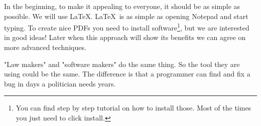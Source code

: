 \documentclass{article}
\begin{document}
In the beginning, to make it appealing to everyone, it should be as simple as possible.
We will use \LaTeX.
\LaTeX~is as simple as opening Notepad and start typing.
To create nice PDFs you need to install software\footnote{You can find step by step tutorial on how to install those. Most of the times you just need to click install.}, but we are interested in good ideas!
Later when this approach will show its benefits we can agree on more advanced techniques.

"Law makers" and "software makers" do the same thing.
So the tool they are using could be the same.
The difference is that a programmer can find and fix a bug in days a politician needs years.
\newpage


\end{document}
